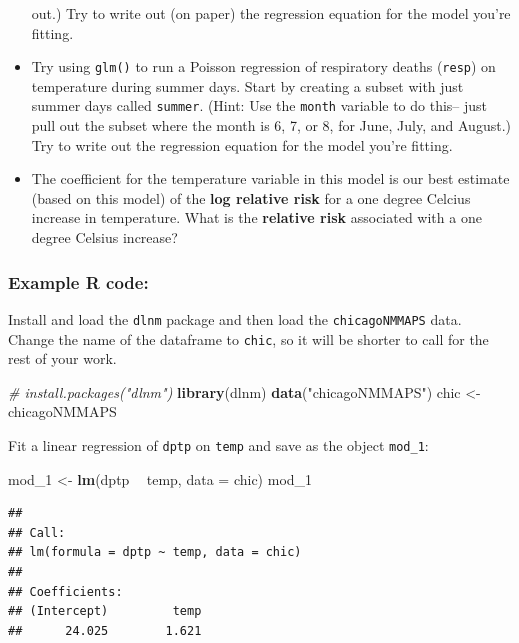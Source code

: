 \documentclass[]{book}
\makeatletter
\newenvironment{Shaded}{\begin{snugshade}}{\end{snugshade}}
\newcommand{\KeywordTok}[1]{\textcolor[rgb]{0.13,0.29,0.53}{\textbf{#1}}}
\newcommand{\DataTypeTok}[1]{\textcolor[rgb]{0.13,0.29,0.53}{#1}}
\newcommand{\DecValTok}[1]{\textcolor[rgb]{0.00,0.00,0.81}{#1}}
\newcommand{\StringTok}[1]{\textcolor[rgb]{0.31,0.60,0.02}{#1}}
\newcommand{\CommentTok}[1]{\textcolor[rgb]{0.56,0.35,0.01}{\textit{#1}}}
\newcommand{\OperatorTok}[1]{\textcolor[rgb]{0.81,0.36,0.00}{\textbf{#1}}}
\newcommand{\NormalTok}[1]{#1}
\newenvironment{kframe}{%
\medskip{}
\setlength{\fboxsep}{.8em}
 \def\at@end@of@kframe{}%
 \ifinner\ifhmode%
  \def\at@end@of@kframe{\end{minipage}}%
  \begin{minipage}{\columnwidth}%
 \fi\fi%
 \def\FrameCommand##1{\hskip\@totalleftmargin \hskip-\fboxsep
 \colorbox{shadecolor}{##1}\hskip-\fboxsep
     \hskip-\linewidth \hskip-\@totalleftmargin \hskip\columnwidth}%
 \MakeFramed {\advance\hsize-\width
   \@totalleftmargin\z@ \linewidth\hsize
   \@setminipage}}%
 {\par\unskip\endMakeFramed%
 \at@end@of@kframe}
\renewenvironment{Shaded}{\begin{kframe}}{\end{kframe}}
\theoremstyle{definition}
\theoremstyle{definition}
\theoremstyle{definition}
\theoremstyle{remark}
\makeatother
\begin{document}
\begin{itemize}
  out.) Try to write out (on paper) the regression equation for the
  model you're fitting.
\item
  Try using \texttt{glm()} to run a Poisson regression of respiratory
  deaths (\texttt{resp}) on temperature during summer days. Start by
  creating a subset with just summer days called \texttt{summer}. (Hint:
  Use the \texttt{month} variable to do this-- just pull out the subset
  where the month is 6, 7, or 8, for June, July, and August.) Try to
  write out the regression equation for the model you're fitting.
\item
  The coefficient for the temperature variable in this model is our best
  estimate (based on this model) of the \textbf{log relative risk} for a
  one degree Celcius increase in temperature. What is the
  \textbf{relative risk} associated with a one degree Celsius increase?
\end{itemize}

\subsubsection{Example R code:}\label{example-r-code-14}

Install and load the \texttt{dlnm} package and then load the
\texttt{chicagoNMMAPS} data. Change the name of the dataframe to
\texttt{chic}, so it will be shorter to call for the rest of your work.

\begin{Shaded}
\begin{Highlighting}[]
\CommentTok{# install.packages("dlnm")}
\KeywordTok{library}\NormalTok{(dlnm)}
\KeywordTok{data}\NormalTok{(}\StringTok{"chicagoNMMAPS"}\NormalTok{)}
\NormalTok{chic <-}\StringTok{ }\NormalTok{chicagoNMMAPS}
\end{Highlighting}
\end{Shaded}

Fit a linear regression of \texttt{dptp} on \texttt{temp} and save as
the object \texttt{mod\_1}:

\begin{Shaded}
\begin{Highlighting}[]
\NormalTok{mod_}\DecValTok{1}\NormalTok{ <-}\StringTok{ }\KeywordTok{lm}\NormalTok{(dptp }\OperatorTok{~}\StringTok{ }\NormalTok{temp, }\DataTypeTok{data =}\NormalTok{ chic)}
\NormalTok{mod_}\DecValTok{1}
\end{Highlighting}
\end{Shaded}

\begin{verbatim}
## 
## Call:
## lm(formula = dptp ~ temp, data = chic)
## 
## Coefficients:
## (Intercept)         temp  
##      24.025        1.621
\end{verbatim}
\end{document}
